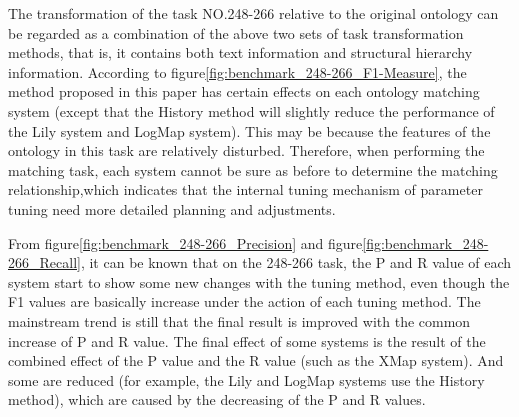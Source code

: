 \documentclass[twoside]{article}
\begin{document}
The transformation of the task NO.248-266 relative to the original ontology can be regarded as a combination of the above two sets of task transformation methods, that is, it contains both text information and structural hierarchy information.
According to figure\ref{fig:benchmark_248-266_F1-Measure}, the method proposed in this paper has certain effects on each ontology matching system (except that the History method will slightly reduce the performance of the Lily system and LogMap system).
This may be because the features of the ontology in this task are relatively disturbed. Therefore, when performing the matching task, each system cannot be sure as before to determine the matching relationship,which indicates that the internal tuning mechanism of parameter tuning need more detailed planning and adjustments.

From figure\ref{fig:benchmark_248-266_Precision} and figure\ref{fig:benchmark_248-266_Recall}, it can be known that on the 248-266 task, the P and R value of each system start to show some new changes with the tuning method, even though the F1 values are basically increase under the action of each tuning method.
The mainstream trend is still that the final result is improved with the common increase of P and R value. The final effect of some systems is the result of the combined effect of the P value and the R value (such as the XMap system). And some are reduced (for example, the Lily and LogMap systems use the History method), which are caused by the decreasing of the P and R values.
\end{document}
